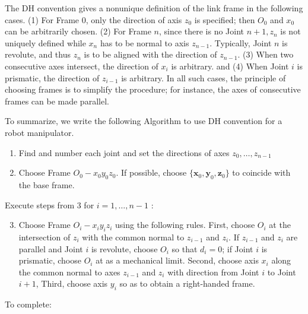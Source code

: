 \documentclass[10pt]{article}
\begin{document}
The DH convention gives a nonunique definition of the link frame in the following cases. (1) For Frame 0, only the direction of axis $z_{0}$ is specified; then $O_{0}$ and $x_{0}$ can be arbitrarily chosen. (2) For Frame $n$, since there is no Joint $n+1, z_{n}$ is not uniquely defined while $x_{n}$ has to be normal to axis $z_{n-1}$. Typically, Joint $n$ is revolute, and thus $z_{n}$ is to be aligned with the direction of $z_{n-1}$. (3) When two consecutive axes intersect, the direction of $x_{i}$ is arbitrary. and (4) When Joint $i$ is prismatic, the direction of $z_{i-1}$ is arbitrary. In all such cases, the principle of choosing frames is to simplify the procedure; for instance, the axes of consecutive frames can be made parallel.






\noindent
To summarize, we write the following Algorithm to use DH convention for a robot manipulator.

\begin{enumerate}
  \item Find and number each joint and  set the directions of axes $z_{0}, \ldots, z_{n-1}$

  \item Choose Frame   $O_{0}-x_{0} y_{0} z_{0}$. If possible,  choose $\{\boldsymbol{x}_{0}, \boldsymbol{y}_{0}, \boldsymbol{z}_{0}\}$ to coincide with the base frame.

\end{enumerate}

Execute steps from 3 for $i=1, \ldots, n-1$ :

\begin{enumerate}
  \setcounter{enumi}{2}
  \item Choose Frame   $O_{i}-x_{i} y_{i} z_{i}$ using the following rules. 
  First, choose $O_{i}$ at the intersection of $z_{i}$ with the common normal to  $z_{i-1}$ and $z_{i}$. If  $z_{i-1}$ and $z_{i}$ are parallel and Joint $i$ is revolute, choose $O_{i}$ so that $d_{i}=0$; if Joint $i$ is prismatic, choose $O_{i}$ at as a mechanical limit. Second, choose axis $x_{i}$ along the common normal to axes $z_{i-1}$ and $z_{i}$ with direction from Joint $i$ to Joint $i+1$, Third, choose axis $y_{i}$ so as to obtain a right-handed frame.

\end{enumerate}

To complete:
\end{document}
